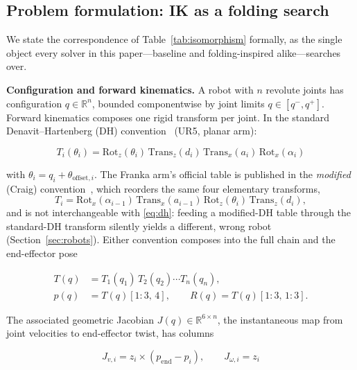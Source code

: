 \documentclass[10pt,conference]{IEEEtran}
\newcommand{\Rot}{\mathrm{Rot}}
\newcommand{\Tra}{\mathrm{Trans}}
\begin{document}
\subsection{Problem formulation: IK as a folding search}
\label{sec:formulation}

We state the correspondence of Table~\ref{tab:isomorphism} formally, as the
single object every solver in this paper---baseline and folding-inspired
alike---searches over.

\textbf{Configuration and forward kinematics.} A robot with $n$ revolute joints
has configuration $q \in \mathbb{R}^n$, bounded componentwise by joint limits
$q \in [q^-, q^+]$. Forward kinematics composes one rigid transform per joint. In
the standard Denavit--Hartenberg (DH) convention~\cite{b39} (UR5, planar arm):

\begin{equation}
T_i(\theta_i) = \Rot_z(\theta_i)\,\Tra_z(d_i)\,\Tra_x(a_i)\,\Rot_x(\alpha_i)
\label{eq:dh}
\end{equation}

with $\theta_i = q_i + \theta_{\mathrm{offset},i}$. The Franka arm's official
table is published in the \emph{modified} (Craig) convention~\cite{b40}, which
reorders the same four elementary transforms,
\begin{equation*}
T_i = \Rot_x(\alpha_{i-1})\,\Tra_x(a_{i-1})\,\Rot_z(\theta_i)\,\Tra_z(d_i),
\end{equation*}
and is not interchangeable with \eqref{eq:dh}: feeding a modified-DH table
through the standard-DH transform silently yields a different, wrong robot
(Section~\ref{sec:robots}). Either convention composes into the full chain and
the end-effector pose

\begin{equation}
\begin{aligned}
T(q) &= T_1(q_1)\,T_2(q_2)\cdots T_n(q_n),\\
p(q) &= T(q)[1{:}3,\,4], \qquad R(q) = T(q)[1{:}3,\,1{:}3].
\end{aligned}
\label{eq:fk}
\end{equation}

The associated geometric Jacobian $J(q) \in \mathbb{R}^{6 \times n}$, the
instantaneous map from joint velocities to end-effector twist, has columns

\begin{equation}
J_{v,i} = z_i \times (p_{\mathrm{end}} - p_i), \qquad J_{\omega,i} = z_i
\label{eq:jac}
\end{equation}
\end{document}
